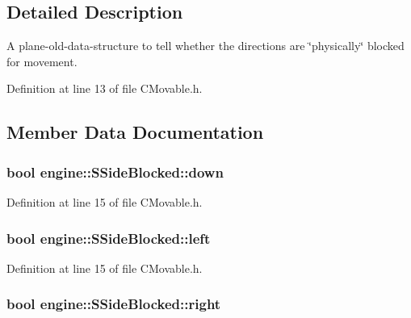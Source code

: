 \subsection{Detailed Description}
A plane-\/old-\/data-\/structure to tell whether the directions are \char`\"{}physically\char`\"{} blocked for movement. 

Definition at line 13 of file C\-Movable.\-h.



\subsection{Member Data Documentation}
\hypertarget{structengine_1_1SSideBlocked_ab0a5ec3de4a3a1f71eb8c28dcaa113ec}{
\subsubsection[{down}]{\setlength{\rightskip}{0pt plus 5cm}bool engine\-::\-S\-Side\-Blocked\-::down}}\label{structengine_1_1SSideBlocked_ab0a5ec3de4a3a1f71eb8c28dcaa113ec}


Definition at line 15 of file C\-Movable.\-h.

\hypertarget{structengine_1_1SSideBlocked_aab2ebe596bade5dd2111290ff4171268}{
\subsubsection[{left}]{\setlength{\rightskip}{0pt plus 5cm}bool engine\-::\-S\-Side\-Blocked\-::left}}\label{structengine_1_1SSideBlocked_aab2ebe596bade5dd2111290ff4171268}


Definition at line 15 of file C\-Movable.\-h.

\hypertarget{structengine_1_1SSideBlocked_af6f555a50cd295e753bc57ba1fe98b7b}{
\subsubsection[{right}]{\setlength{\rightskip}{0pt plus 5cm}bool engine\-::\-S\-Side\-Blocked\-::right}}\label{structengine_1_1SSideBlocked_af6f555a50cd295e753bc57ba1fe98b7b}


